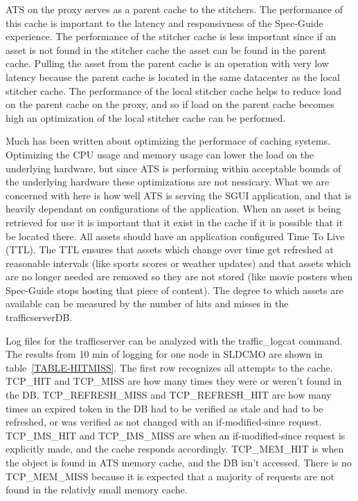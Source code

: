 \documentclass{article}
\begin{document}
ATS on the proxy serves as a parent cache to the stitchers. The performance of this cache is important to the latency and responsivness of the Spec-Guide experience. The performance of the stitcher cache is less important since if an asset is not found in the stitcher cache the asset can be found in the parent cache. Pulling the asset from the parent cache is an operation with very low latency because the parent cache is located in the same datacenter as the local stitcher cache. The performance of the local stitcher cache helps to reduce load on the parent cache on the proxy, and so if load on the parent cache becomes high an optimization of the local stitcher cache can be performed. 

Much has been written about optimizing the performace of caching systems. Optimizing the CPU usage and memory usage can lower the load on the underlying hardware, but since ATS is performing within acceptable bounds of the underlying hardware these optimizations are not nessicary. What we are concerned with here is how well ATS is serving the SGUI application, and that is heavily dependant on configurations of the application. When an asset is being retrieved for use it is important that it exist in the cache if it is possible that it be located there. All assets should have an application configured Time To Live (TTL). The TTL ensures that assets which change over time get refreshed at reasonable intervals (like sports scores or weather updates) and that assets which are no longer needed are removed so they are not stored (like movie posters when Spec-Guide stops hosting that piece of content). The degree to which assets are available can be measured by the number of hits and misses in the trafficserverDB. 

Log files for the trafficserver can be analyzed with the traffic\_logcat command. The results from 10 min of logging for one node in SLDCMO are shown in table~\ref{TABLE-HITMISS}. The first row recognizes all attempts to the cache. TCP\_HIT and TCP\_MISS are how many times they were or weren't found in the DB. TCP\_REFRESH\_MISS and TCP\_REFRESH\_HIT are how many times an expired token in the DB had to be verified as stale and had to be refreshed, or was verified as not changed with an if-modified-since request. TCP\_IMS\_HIT and TCP\_IMS\_MISS are when an if-modified-since request is explicitly made, and the cache responds accordingly. TCP\_MEM\_HIT is when the object is found in ATS memory cache, and the DB isn't accessed. There is no TCP\_MEM\_MISS because it is expected that a majority of requests are not found in the relativly small memory cache. 
\end{document}
